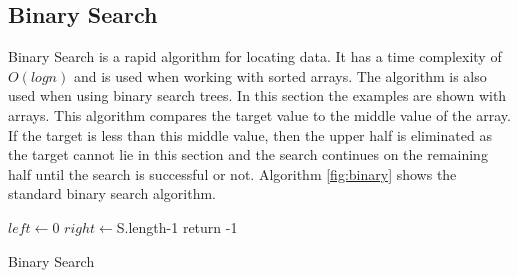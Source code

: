 \documentclass[10pt,twocolumn]{IEEEtran}
\begin{document}
\subsection{Binary Search}
Binary Search is a rapid algorithm for locating data. It has a time complexity of $O(log{n})$ and is used when working with sorted arrays. The algorithm is also used when using binary search trees. In this section the examples are shown with arrays. This algorithm compares the target value to the middle value of the array. If the target is less than this middle value, then the upper half is eliminated as the target cannot lie in this section and the search continues on the remaining half until the search is successful or not. Algorithm \ref{fig:binary} shows the standard binary search algorithm.
\IncMargin{1em}
\begin{algorithm}
	\SetAlgoLined
	$left \longleftarrow $0\;
	$right \longleftarrow $S.length-1\;
	return -1\;
\caption{Binary Search}
\label{fig:binary}
\end{algorithm}\DecMargin{1em}
\end{document}
